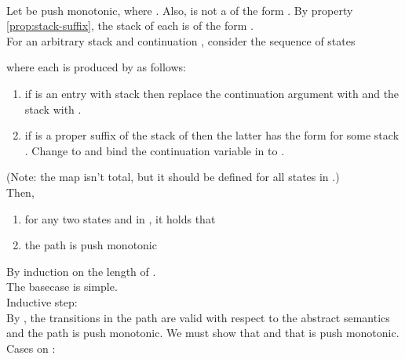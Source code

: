 \documentclass{LMCS}
\theoremstyle{definition} \newtheorem{property}[thm]{Property}
\begin{document}
\begin{lem}\label{lem:stack-irrel}  ~\\
  Let 
  be push monotonic,
  where .
  Also,  is not a \dacapply{} of the form 
  .
  By property \ref{prop:stack-suffix}, the stack of each  is of the
  form .
  \\
  For an arbitrary stack  and continuation , 
  consider the sequence  of states 
   
  where each  is produced by  as follows:
  \begin{enumerate}[]
  \item 
    if  is an entry with stack  then replace the 
    continuation argument with  and the stack with .
  \item
    if  is a proper suffix of the stack of  then 
    the latter has the form 
    for some stack .
    Change  to  and bind the continuation variable in 
     to .
  \end{enumerate}
  (Note: the map isn't total, but it should be defined for all states 
  in .) \\
  Then, 
  \begin{enumerate}[]
  \item
    for any two states  and  in , it holds that
    
  \item
    the path  is push monotonic
  \end{enumerate}
\end{lem}
\newcommand{\astatnmo}{\eh{\astat_{n-1}}}
\proof
By induction on the length of . \\
The basecase is simple. \\
Inductive step:
 \\
By \ih, the transitions in the path  
are valid with respect to the abstract semantics and the path is push monotonic.
We must show that  and that
 is push monotonic. \\
Cases on :
\end{document}
